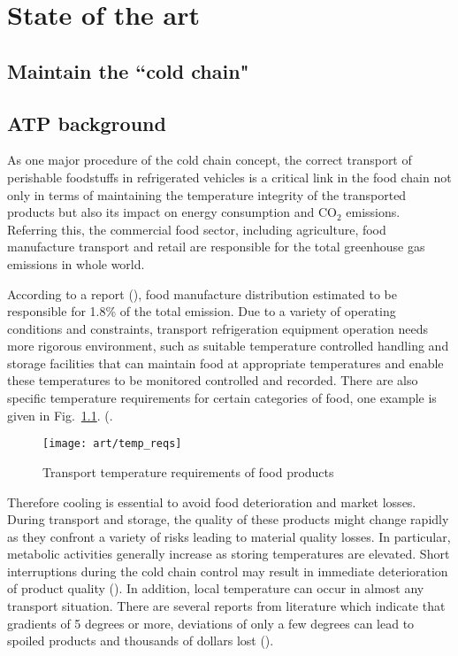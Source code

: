 \chapter{State of the art}     %
\section*{Maintain the ``cold chain"}

\section{ATP background}
As one major procedure of the cold chain concept, the correct transport of perishable foodstuffs in refrigerated vehicles is a critical link in the food chain not only in terms of maintaining the temperature integrity of the transported products but also its impact on energy consumption and CO$_2$ emissions. Referring this, the  commercial food sector, including agriculture, food manufacture transport and retail are responsible for the total greenhouse gas emissions in whole world.

According to a report (\citet{watkiss2005validity}), food manufacture distribution estimated to be responsible for 1.8\% of the total emission. Due to a variety of operating conditions and constraints, transport refrigeration equipment operation needs more rigorous environment, such as suitable temperature controlled handling and storage facilities that can maintain food at appropriate temperatures and enable these temperatures to be monitored controlled and recorded. There are also specific temperature requirements for certain categories of food, one example is given in Fig.~\ref{tem_reqs}. (\citet{tassou2009food}.
\begin{figure}[ht]
	\centering
	\texttt{[image: art/temp\_reqs]}
	\label{tem_reqs}
	\caption{Transport temperature requirements of food products}
\end{figure}

Therefore cooling is essential to avoid food deterioration and market losses.  During transport and storage, the quality of these products might change rapidly as they confront a variety of risks leading to material quality losses. In particular, metabolic activities generally increase as storing temperatures are elevated. Short interruptions during the cold chain control may result in immediate deterioration of product quality (\citet{Nunes2003Quality}). In addition, local temperature can occur in almost any transport situation. There are several reports from literature which indicate that gradients of 5 degrees or more, deviations of only a few degrees can lead to spoiled products and thousands of dollars lost (\citet{Tanner2003Modelling, Nunes2006Brief, Rodriguez-Bermejo2007Thermal}).

